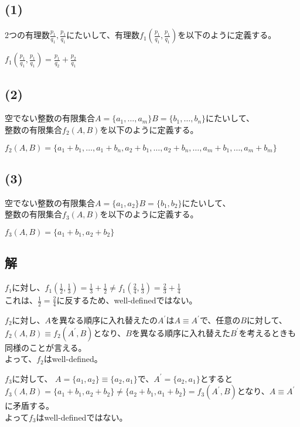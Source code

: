 \documentclass[12pt,a4paper]{article}
\begin{document}
  \subsection*{(1)}

    2つの有理数$\frac{p_1}{q_1},\frac{p_1}{q_1}$にたいして、有理数$f_1 (\frac{p_1}{q_1},\frac{p_1}{q_1})$を以下のように定義する。

    $f_1(\frac{p_1}{q_1},\frac{p_1}{q_1}) = \frac{p_1}{q_2} + \frac{p_2}{q_1}$

  \subsection*{(2)}
    
    空でない整数の有限集合$A = \lbrace a_1, \dots ,a_m \rbrace B = \lbrace b_1, \dots ,b_n \rbrace$にたいして、\\
    整数の有限集合$f_2(A,B)$を以下のように定義する。
    
    $f_2(A,B) = \lbrace a_1 + b_1 , \dots , a_1 + b_n , a_2 + b_1 , \dots , a_2 + b_n , \dots , a_m + b_1 , \dots , a_m + b_m \rbrace $
  
  \subsection*{(3)}
    
    空でない整数の有限集合$A = \lbrace a_1, a_2 \rbrace B = \lbrace b_1, b_2 \rbrace$にたいして、\\
    整数の有限集合$f_3(A,B)$を以下のように定義する。

    $f_3(A,B) = \lbrace a_1 + b_1, a_2 + b_2 \rbrace$

  \subsection*{解}
    $f_1$に対し、$f_1(\frac{1}{2},\frac{1}{3}) = \frac{1}{3} + \frac{1}{2} \neq f_1(\frac{2}{4}, \frac{1}{3}) = \frac{2}{3} + \frac{1}{4}$\\
    これは、$\frac{1}{2} = \frac{2}{4}$に反するため、well-definedではない。

    \noindent
    $f_2$に対し、$A$を異なる順序に入れ替えたの$A^\prime$は$A \equiv A^\prime$で、任意の$B$に対して、$f_2(A, B) \equiv f_2(A^\prime, B)$となり、$B$を異なる順序に入れ替えた$B^\prime$を考えるときも同様のことが言える。\\
    よって、$f_2$はwell-defined。

    \noindent
    $f_3$に対して、 $A = \lbrace a_1, a_2 \rbrace \equiv \lbrace a_2, a_1 \rbrace$で、$A^\prime = \lbrace a_2, a_1 \rbrace$とすると\\
    $f_3(A, B) = \lbrace a_1 + b_1 , a_2 + b_2 \rbrace \neq \lbrace a_2 + b_1 , a_1 + b_2 \rbrace = f_3(A^\prime, B)$となり、$A \equiv A^\prime$に矛盾する。\\
    よって$f_3$はwell-definedではない。
\end{document}
